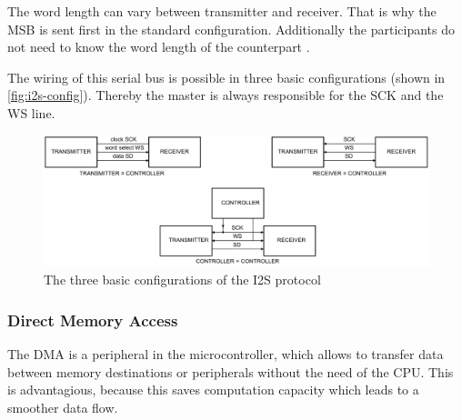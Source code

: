 The word length can vary between transmitter and receiver. That is why the \ac{MSB} is sent first in the standard 
configuration. Additionally the participants do not need to know the word length of the counterpart \cite{nxp_i2s}.

The wiring of this serial bus is possible in three basic configurations (shown in \autoref{fig:i2s-config}).
Thereby the master is always responsible for the SCK and the WS line.

\begin{figure}[!h]
    \centering
    \includegraphics[width=14cm]{img/i2s_config.png}
    \caption{The three basic configurations of the \ac{I2S} protocol \cite{nxp_i2s}}
    \label{fig:i2s-config}
\end{figure}

\subsubsection{Direct Memory Access}
\label{sec:dma}

The \ac{DMA} is a peripheral in the microcontroller, which allows to transfer data between memory destinations or
peripherals without the need of the \ac{CPU}.
This is advantagious, because this saves computation capacity which leads to a smoother data flow.
